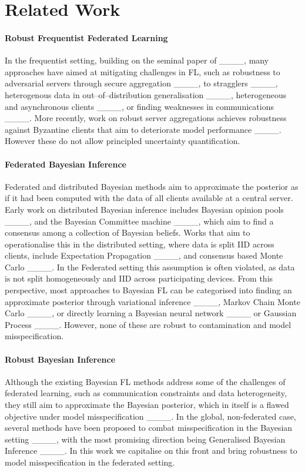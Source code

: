 \section{Related Work}
\paragraph{Robust Frequentist Federated Learning} In the frequentist setting, building on the seminal paper of ____, many approaches have aimed at mitigating challenges in FL, such as robustness to adversarial servers through secure aggregation ____, to stragglers ____, heterogenous data in out--of--distribution generalisation ____, heterogeneous and asynchronous clients ____, or finding weaknesses in communications ____. 
More recently, %
work on robust server aggregations achieves robustness against Byzantine clients that aim to deteriorate model performance ____. However these do not allow principled uncertainty quantification.

\paragraph{Federated Bayesian Inference}
Federated and distributed Bayesian methods aim to approximate the posterior as if it had been computed with the data of all clients available at a central server. 
Early work on distributed Bayesian inference includes Bayesian opinion pools ____, and the Bayesian Committee machine ____, which aim to find a consensus among a collection of Bayesian beliefs. 
Works that aim to operationalise this in the distributed setting, where data is split IID across clients, include Expectation Propagation ____, and consensus based Monte Carlo ____.
In the Federated setting this assumption is often violated, as data is not split homogeneously and IID across participating devices. 
From this perspective, most approaches to Bayesian FL can be categorised into finding an approximate posterior through variational inference ____,  Markov Chain Monte Carlo ____, or directly learning a Bayesian neural network ____ or Gaussian Process ____. However, none of these  are robust to contamination and model misspecification.



\paragraph{Robust Bayesian Inference} 
Although the existing Bayesian FL methods address some of the challenges of federated learning, such as communication constraints and data heterogeneity, they still aim to approximate the Bayesian posterior, which in itself is a flawed objective under model misspecification ____.
In the global, non-federated case, several methods have been proposed to combat misspecification in the Bayesian setting ____, with the most promising direction being Generalised Bayesian Inference ____. In this work we capitalise on this front and bring robustness to model misspecification in the federated setting.